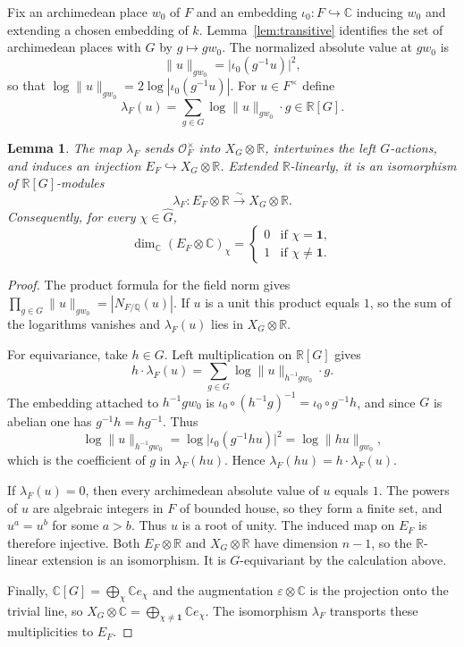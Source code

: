 \documentclass[11pt]{article}
\theoremstyle{plain}
\newtheorem{lemma}[theorem]{Lemma}
\theoremstyle{definition}
\theoremstyle{remark}
\newcommand{\Q}{\mathbb{Q}}
\newcommand{\R}{\mathbb{R}}
\newcommand{\C}{\mathbb{C}}
\newcommand{\OK}{\mathcal{O}}
\newcommand{\triv}{\mathbf{1}}
\begin{document}
Fix an archimedean place $w_0$ of $F$ and an embedding $\iota_0:F\hookrightarrow\C$ inducing $w_0$ and extending a chosen embedding of $k$.
Lemma~\ref{lem:transitive} identifies the set of archimedean places with $G$ by $g\mapsto gw_0$.
The normalized absolute value at $gw_0$ is
\[
  \|u\|_{gw_0}=\bigl|\iota_0(g^{-1}u)\bigr|^2,
\]
so that $\log\|u\|_{gw_0}=2\log|\iota_0(g^{-1}u)|$.
For $u\in F^{\times}$ define
\begin{equation}
\label{eq:lambda}
  \lambda_F(u)=\sum_{g\in G}\log\|u\|_{gw_0}\cdot g\in\R[G].
\end{equation}

\begin{lemma}
\label{lem:lambda}
The map $\lambda_F$ sends $\OK_F^{\times}$ into $X_G\otimes\R$, intertwines the left $G$-actions, and induces an injection $E_F\hookrightarrow X_G\otimes\R$.
Extended $\R$-linearly, it is an isomorphism of $\R[G]$-modules
\[
  \lambda_F:E_F\otimes\R\xrightarrow{\sim}X_G\otimes\R.
\]
Consequently, for every $\chi\in\widehat G$,
\[
  \dim_{\C}(E_F\otimes\C)_{\chi}=
  \begin{cases}
    0& \text{if }\chi=\triv,\\
    1& \text{if }\chi\neq\triv.
  \end{cases}
\]
\end{lemma}

\begin{proof}
The product formula for the field norm gives $\prod_{g\in G}\|u\|_{gw_0}=|N_{F/\Q}(u)|$.
If $u$ is a unit this product equals $1$, so the sum of the logarithms vanishes and $\lambda_F(u)$ lies in $X_G\otimes\R$.

For equivariance, take $h\in G$.
Left multiplication on $\R[G]$ gives
\[
  h\cdot\lambda_F(u)=\sum_{g\in G}\log\|u\|_{h^{-1}gw_0}\cdot g.
\]
The embedding attached to $h^{-1}gw_0$ is $\iota_0\circ(h^{-1}g)^{-1}=\iota_0\circ g^{-1}h$, and since $G$ is abelian one has $g^{-1}h=hg^{-1}$.
Thus
\[
  \log\|u\|_{h^{-1}gw_0}
  =\log\bigl|\iota_0(g^{-1}hu)\bigr|^2
  =\log\|hu\|_{gw_0},
\]
which is the coefficient of $g$ in $\lambda_F(hu)$.
Hence $\lambda_F(hu)=h\cdot\lambda_F(u)$.

If $\lambda_F(u)=0$, then every archimedean absolute value of $u$ equals $1$.
The powers of $u$ are algebraic integers in $F$ of bounded house, so they form a finite set, and $u^{a}=u^{b}$ for some $a>b$.
Thus $u$ is a root of unity.
The induced map on $E_F$ is therefore injective.
Both $E_F\otimes\R$ and $X_G\otimes\R$ have dimension $n-1$, so the $\R$-linear extension is an isomorphism.
It is $G$-equivariant by the calculation above.

Finally, $\C[G]=\bigoplus_{\chi} \C e_{\chi}$ and the augmentation $\varepsilon\otimes\C$ is the projection onto the trivial line, so $X_G\otimes\C=\bigoplus_{\chi\neq\triv}\C e_{\chi}$.
The isomorphism $\lambda_F$ transports these multiplicities to $E_F$.
\end{proof}
\end{document}
